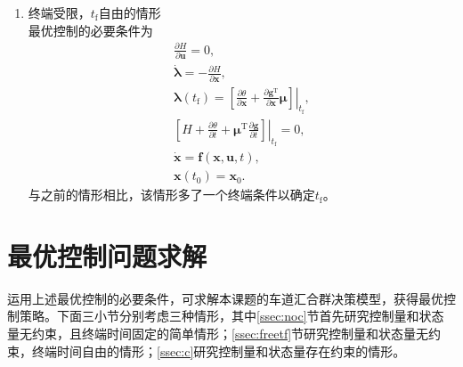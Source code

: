 \begin{enumerate}
\item {\heiti 终端受限，$t_\mathrm{f}$自由的情形}
\\最优控制的必要条件为
\begin{gather}
\frac{\partial H}{\partial\bm{u}}=0,\label{eq:cn:control}\\
\dot{\bm{\lambda}}=-\frac{\partial H}{\partial\bm{x}},\label{eq:cn:company}\\
\bm{\lambda}(t_\mathrm{f})=\left. \left[\frac{\partial \theta}{\partial \bm{x}}+\frac{\partial \bm{g}^\mathrm{T}}{\partial \bm{x}}\bm{\mu}\right]\right|_{t_\mathrm{f}},\label{eq:cn:final}\\
\left. \left[H+\frac{\partial\theta}{\partial t}+\bm{\mu}^\mathrm{T}\frac{\partial\bm{g}}{\partial t}\right]\right|_{t_\mathrm{f}}=0,\label{eq:cn:final2}\\
\dot{\bm{x}}=\bm{f}(\bm{x},\bm{u},t),\\
\bm{x}(t_0)=\bm{x}_0.\label{eq:cn:last}
\end{gather}
与之前的情形相比，该情形多了一个终端条件以确定$t_\mathrm{f}$。
\end{enumerate}

\section{最优控制问题求解}
\label{sec:solve}
运用上述最优控制的必要条件，可求解本课题的车道汇合群决策模型，获得最优控制策略。下面三小节分别考虑三种情形，其中\ref{ssec:noc}节首先研究控制量和状态量无约束，且终端时间固定的简单情形；\ref{ssec:freetf}节研究控制量和状态量无约束，终端时间自由的情形；\ref{ssec:c}研究控制量和状态量存在约束的情形。

